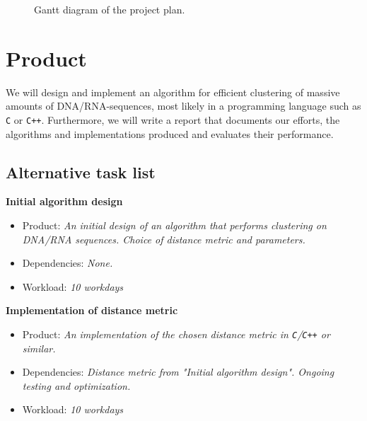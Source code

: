 \documentclass[11pt,a4paper]{article}
\begin{document}
\begin{figure}[H]
  \begin{gantt}[xunitlength=0.5cm,fontsize=\small,titlefontsize=\small]{10}{20}
    \begin{ganttitle}
    \end{ganttitle}
  \end{gantt}
  \caption{Gantt diagram of the project plan.}
  \label{fig:gantt}
\end{figure}


\section{Product}
We will design and implement an algorithm for efficient clustering of massive
amounts of DNA/RNA-sequences, most likely in a programming language such as
\texttt{C} or \texttt{C++}. Furthermore, we will write a report that documents
our efforts, the algorithms and implementations produced and evaluates their
performance.

\newpage
\subsection{Alternative task list}
\textbf{Initial algorithm design}
\begin{itemize}
  \item Product: \textit{An initial design of an algorithm that performs
    clustering on DNA/RNA sequences. Choice of distance metric and parameters.}
  \item Dependencies: \textit{None.}
  \item Workload: \textit{10 workdays}
\end{itemize}

\noindent
\textbf{Implementation of distance metric}
\begin{itemize}
  \item Product: \textit{An implementation of the chosen distance metric in
    \texttt{C}/\texttt{C++} or similar.}
  \item Dependencies: \textit{Distance metric from "Initial algorithm design".
    Ongoing testing and optimization.}
  \item Workload: \textit{10 workdays}
\end{itemize}
\end{document}
